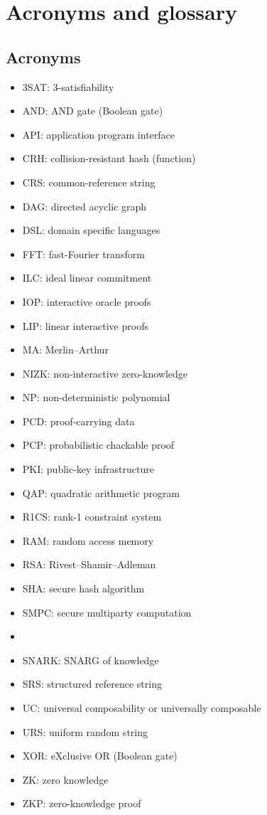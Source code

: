 \appendix
{}\chapter{Acronyms and glossary} 
\label{security:abbreviations}


\section{Acronyms}
\label{app:acronyms}

\begin{multicols}{2}\small
\begin{itemize}
\item 3SAT: 3-satisfiability
\item AND: AND gate (Boolean gate)
\item API: application program interface
\item CRH: collision-resistant hash (function)
\item CRS: common-reference string
\item DAG: directed acyclic graph
\item DSL: domain specific languages
\item FFT: fast-Fourier transform
\item ILC: ideal linear commitment
\item IOP: interactive oracle proofs
\item LIP: linear interactive proofs
\item MA: Merlin--Arthur
\item NIZK: non-interactive zero-knowledge
\item NP: non-deterministic polynomial
\item PCD: proof-carrying data
\item PCP: probabilistic chackable proof
\item PKI: public-key infrastructure
\item QAP: quadratic arithmetic program
\item R1CS: rank-1 constraint system
\item RAM: random access memory 
\item RSA: Rivest--Shamir--Adleman
\item SHA: secure hash algorithm
\item SMPC: secure multiparty computation
\item {}
\item SNARK: SNARG of knowledge
\item SRS: structured reference string
\item UC: universal composability or universally composable
\item URS: uniform random string
\item XOR: eXclusive OR (Boolean gate)
\item ZK: zero knowledge
\item ZKP: zero-knowledge proof
\end{itemize}
\end{multicols}


